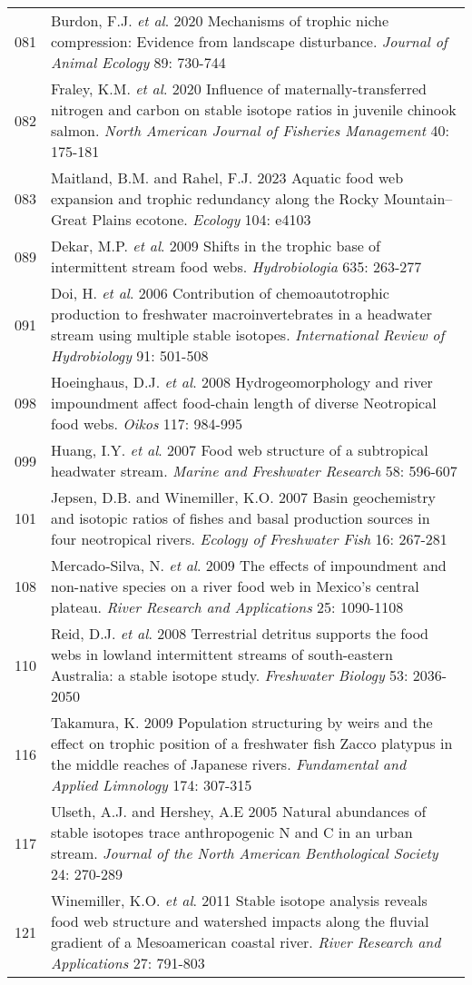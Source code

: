 \begin{longtable}{p{}p{}}
  081 & Burdon, F.J. \textit{et al}. 2020 Mechanisms of trophic niche compression: Evidence from landscape disturbance. \textit{Journal of Animal Ecology} 89: 730-744 \\ 
  082 & Fraley, K.M. \textit{et al}. 2020 Influence of maternally-transferred nitrogen and carbon on stable isotope ratios in juvenile chinook salmon. \textit{North American Journal of Fisheries Management} 40: 175-181 \\ 
  083 & Maitland, B.M. and Rahel, F.J. 2023 Aquatic food web expansion and trophic redundancy along the Rocky Mountain–Great Plains ecotone. \textit{Ecology} 104: e4103 \\ 
  089 & Dekar, M.P. \textit{et al}. 2009 Shifts in the trophic base of intermittent stream food webs. \textit{Hydrobiologia} 635: 263-277 \\ 
  091 & Doi, H. \textit{et al}. 2006 Contribution of chemoautotrophic production to freshwater macroinvertebrates in a headwater stream using multiple stable isotopes. \textit{International Review of Hydrobiology} 91: 501-508 \\ 
  098 & Hoeinghaus, D.J. \textit{et al}. 2008 Hydrogeomorphology and river impoundment affect food-chain length of diverse Neotropical food webs. \textit{Oikos} 117: 984-995 \\ 
  099 & Huang, I.Y. \textit{et al}. 2007 Food web structure of a subtropical headwater stream. \textit{Marine and Freshwater Research} 58: 596-607 \\ 
  101 & Jepsen, D.B. and Winemiller, K.O. 2007 Basin geochemistry and isotopic ratios of fishes and basal production sources in four neotropical rivers. \textit{Ecology of Freshwater Fish} 16: 267-281 \\ 
  108 & Mercado‐Silva, N. \textit{et al}. 2009 The effects of impoundment and non-native species on a river food web in Mexico's central plateau. \textit{River Research and Applications} 25: 1090-1108 \\ 
  110 & Reid, D.J. \textit{et al}. 2008 Terrestrial detritus supports the food webs in lowland intermittent streams of south-eastern Australia: a stable isotope study. \textit{Freshwater Biology} 53: 2036-2050 \\ 
  116 & Takamura, K. 2009 Population structuring by weirs and the effect on trophic position of a freshwater fish Zacco platypus in the middle reaches of Japanese rivers. \textit{Fundamental and Applied Limnology} 174: 307-315 \\ 
  117 & Ulseth, A.J. and Hershey, A.E 2005 Natural abundances of stable isotopes trace anthropogenic N and C in an urban stream. \textit{Journal of the North American Benthological Society} 24: 270-289 \\ 
  121 & Winemiller, K.O. \textit{et al}. 2011 Stable isotope analysis reveals food web structure and watershed impacts along the fluvial gradient of a Mesoamerican coastal river. \textit{River Research and Applications} 27: 791-803 \\ 
   \hline
\hline
\end{longtable}
\endgroup
